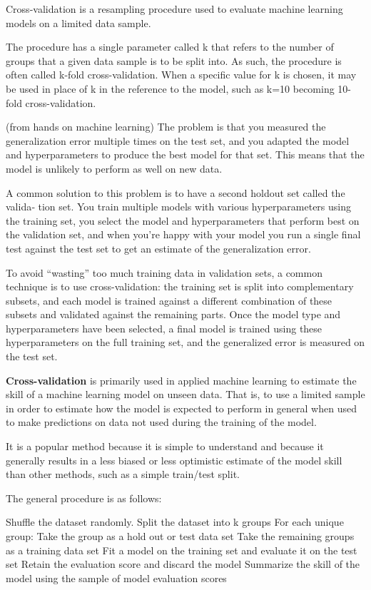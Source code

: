 Cross-validation is a resampling procedure used to evaluate machine learning models on a limited data sample.

The procedure has a single parameter called k that refers to the number of groups that a given data sample is to be split into. As such, the procedure is often called k-fold cross-validation. When a specific value for k is chosen, it may be used in place of k in the reference to the model, such as k=10 becoming 10-fold cross-validation.



(from hands on machine learning)
The problem is that you measured the generalization error multiple times on the test set, and you adapted the model and hyperparameters to produce the best model for that set. This means that the model is unlikely to perform as well on new data.

A common solution to this problem is to have a second holdout set called the valida‐ tion set. You train multiple models with various hyperparameters using the training set, you select the model and hyperparameters that perform best on the validation set, and when you’re happy with your model you run a single final test against the test set to get an estimate of the generalization error.

To avoid “wasting” too much training data in validation sets, a common technique is to use cross-validation: the training set is split into complementary subsets, and each model is trained against a different combination of these subsets and validated against the remaining parts. Once the model type and hyperparameters have been selected, a final model is trained using these hyperparameters on the full training set, and the generalized error is measured on the test set. 

\textbf{Cross-validation} is primarily used in applied machine learning to estimate the skill of a machine learning model on unseen data. That is, to use a limited sample in order to estimate how the model is expected to perform in general when used to make predictions on data not used during the training of the model.

It is a popular method because it is simple to understand and because it generally results in a less biased or less optimistic estimate of the model skill than other methods, such as a simple train/test split.

The general procedure is as follows:

Shuffle the dataset randomly.
Split the dataset into k groups
For each unique group:
Take the group as a hold out or test data set
Take the remaining groups as a training data set
Fit a model on the training set and evaluate it on the test set
Retain the evaluation score and discard the model
Summarize the skill of the model using the sample of model evaluation scores



